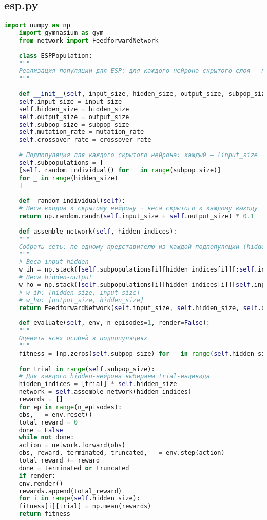 \documentclass[a4paper,12pt]{article}
\begin{document}
\subsection*{esp.py}
\begin{lstlisting}[language=Python, caption={esp.py}]
	import numpy as np
	import gymnasium as gym
	from network import FeedforwardNetwork
	
	class ESPPopulation:
	"""
	Реализация популяции для ESP: для каждого нейрона скрытого слоя — подпопуляция (особи = вектор весов входов + веса выхода)
	"""
	
	def __init__(self, input_size, hidden_size, output_size, subpop_size=20, mutation_rate=0.1, crossover_rate=0.5):
	self.input_size = input_size
	self.hidden_size = hidden_size
	self.output_size = output_size
	self.subpop_size = subpop_size
	self.mutation_rate = mutation_rate
	self.crossover_rate = crossover_rate
	
	# Подпопуляция для каждого скрытого нейрона: каждый — (input_size + output_size) весов
	self.subpopulations = [
	[self._random_individual() for _ in range(subpop_size)]
	for _ in range(hidden_size)
	]
	
	def _random_individual(self):
	# Веса входов к скрытому нейрону + веса скрытого к каждому выходу
	return np.random.randn(self.input_size + self.output_size) * 0.1
	
	def assemble_network(self, hidden_indices):
	"""
	Собрать сеть: по одному представителю из каждой подпопуляции (hidden_indices — индексы в каждой подпопуляции)
	"""
	# Веса input-hidden
	w_ih = np.stack([self.subpopulations[i][hidden_indices[i]][:self.input_size] for i in range(self.hidden_size)])
	# Веса hidden-output
	w_ho = np.stack([self.subpopulations[i][hidden_indices[i]][self.input_size:] for i in range(self.hidden_size)]).T
	# w_ih: [hidden_size, input_size]
	# w_ho: [output_size, hidden_size]
	return FeedforwardNetwork(self.input_size, self.hidden_size, self.output_size, w_ih, w_ho)
	
	def evaluate(self, env, n_episodes=1, render=False):
	"""
	Оценить всех особей в подпопуляциях
	"""
	fitness = [np.zeros(self.subpop_size) for _ in range(self.hidden_size)]
	
	for trial in range(self.subpop_size):
	# Для каждого hidden-нейрона выбираем trial-индивида
	hidden_indices = [trial] * self.hidden_size
	network = self.assemble_network(hidden_indices)
	rewards = []
	for ep in range(n_episodes):
	obs, _ = env.reset()
	total_reward = 0
	done = False
	while not done:
	action = network.forward(obs)
	obs, reward, terminated, truncated, _ = env.step(action)
	total_reward += reward
	done = terminated or truncated
	if render:
	env.render()
	rewards.append(total_reward)
	for i in range(self.hidden_size):
	fitness[i][trial] = np.mean(rewards)
	return fitness
	

\end{lstlisting}
\end{document}
